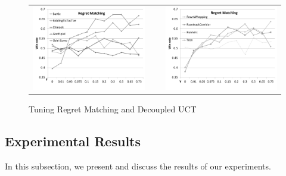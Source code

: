\documentclass[conference]{IEEEtran}
\begin{document}
\begin{figure}[t!]
\begin{tabular}{ccc}
\includegraphics[scale=0.3]{figures/regretmatching1} & ~ & \includegraphics[scale=0.3]{figures/regretmatching2}\\
\end{tabular}
\caption{Tuning Regret Matching and Decoupled UCT}
\label{fig:tuning1}
\end{figure}

\subsection{Experimental Results}
\label{subsec:results}

In this subsection, we present and discuss the results of our experiments. 
\end{document}
